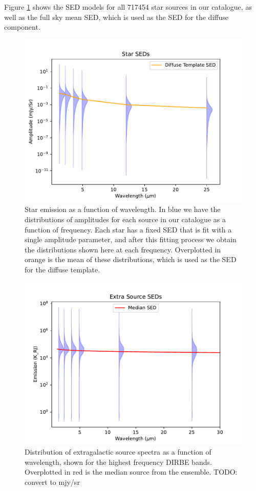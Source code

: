 \documentclass{aa}
\begin{document}
Figure \ref{fig:starSEDs} shows the SED models for all 717454 star sources in our catalogue, as well as the full sky mean SED, which is used as the SED for the diffuse component. 

\begin{figure}
  \includegraphics[width=\columnwidth]{figs/starseds/star_seds.pdf}
  \caption{Star emission as a function of wavelength. In blue we have the distributions of amplitudes for each source in our catalogue as a function of frequency. Each star has a fixed SED that is fit with a single amplitude parameter, and after this fitting process we obtain the distributions shown here at each frequency. Overplotted in orange is the mean of these distributions, which is used as the SED for the diffuse template.}
  \label{fig:starSEDs}
\end{figure}

\begin{figure}
  \includegraphics[width=\columnwidth]{figs/starseds/exgal_spectra.pdf}
  \caption{Distribution of extragalactic source spectra as a function of wavelength, shown for the highest frequency DIRBE bands. Overplotted in red is the median source from the ensemble. TODO: convert to mjy/sr}
  \label{fig:exgalSEDs}
\end{figure}
\end{document}
